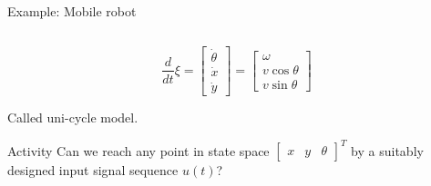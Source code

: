 \documentclass[presentation,aspectratio=169]{beamer}
\begin{document}
\begin{frame}[label={sec:orgafb5849}]{Example: Mobile robot}
\begin{columns}
\begin{column}{0.6\columnwidth}
\[\frac{d}{dt} \xi = \begin{bmatrix} \dot{\theta}\\\dot{x}\\\dot{y} \end{bmatrix} = \begin{bmatrix} \omega\\ v\cos\theta\\v\sin\theta\end{bmatrix} \]

Called uni-cycle model.
\pause

\alert{Activity} Can we reach any point in state space \(\begin{bmatrix} x &  y & \theta \end{bmatrix}^T\) by a suitably designed input signal sequence \(u(t)\)?
\end{column}
\end{columns}
\end{frame}
\end{document}
